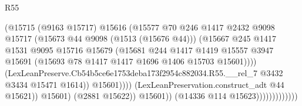 \begin{lexlean}{R55}
\begin{coremodule}
{{                                              (@15715
                                                (@9163 @15717)
                                                @15616
                                                (@15577
                                                  @70
                                                  @246
                                                  @1417
                                                  @2432
                                                  @9098
                                                  @15717
                                                  (@15673 @44 @9098 (@1513 (@15676 @44)))
                                                  (@15667
                                                    @245
                                                    @1417
                                                    @1531
                                                    @9095
                                                    @15716
                                                    @15679
                                                    (@15681
                                                      @244
                                                      @1417
                                                      @1419
                                                      @15557
                                                      @3947
                                                      @15691
                                                      (@15693
                                                        @78
                                                        @1417
                                                        @1417
                                                        @1696
                                                        @1406
                                                        @15703
                                                        @15601))))
                                                (LexLeanPreserve.Cb54b5ce6e1753deba173f2954c882034.R55.__rel_7
                                                  @3432
                                                  @3434
                                                  @15471
                                                  @1614))
                                              @15601))))
                                      (LexLeanPreservation.construct_adt @44 @15621))
                                    @15601)
                                  (@2881 @15622))
                                @15601))
                            (@14336 @114 @15623)))))))))))))
}}
\end{coremodule}
\end{lexlean}
